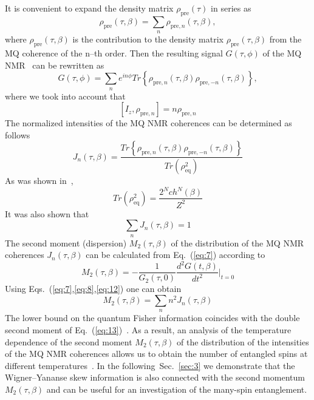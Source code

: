 \documentclass[preprint,12pt]{elsarticle}
\begin{document}
It is convenient to expand the density matrix $\rho_\mathrm{pre}(\tau)$ in series as~\cite{21}
\begin{equation}
    \label{eq:6}
        \rho_\mathrm{pre}(\tau,\beta) = \sum_n \rho_{\mathrm{pre},n}(\tau,\beta),
\end{equation}
where $\rho_\mathrm{pre}(\tau,\beta)$ is the contribution to the density matrix $\rho_\mathrm{pre}(\tau,\beta)$ from the MQ coherence of the n--th order.
Then the resulting signal $G(\tau,\phi)$ of the MQ NMR~\cite{10} can be rewritten as
\begin{equation} \label{eq:7}
    G(\tau, \phi) = \sum_n e^{in\phi}
        Tr\left\{\rho_{\mathrm{pre},n}(\tau,\beta)
        \rho_{\mathrm{pre},-n}(\tau,\beta) \right\},
\end{equation}
where we took into account that
\begin{equation}
    \label{eq:8}
        [I_z, \rho_{\mathrm{pre},n}] = n \rho_{\mathrm{pre},n}
\end{equation}
The normalized intensities of the MQ NMR coherences can be determined as follows
\begin{equation}
    \label{eq:9}
        J_n(\tau,\beta)= \frac{Tr\left\{\rho_{\mathrm{pre},n}(\tau,\beta)
            \rho_{\mathrm{pre},-n}(\tau,\beta)\right\}}
                {Tr(\rho^2_\mathrm{eq})}
\end{equation}
As was shown in~\cite{8},
\begin{equation}
    \label{eq:10}
        Tr(\rho_\mathrm{eq}^2) = \frac{2^N ch^N (\beta)}{Z^2}
\end{equation}
It was also shown that
\begin{equation}
    \label{eq:11}
        \sum_n J_n(\tau,\beta) = 1
\end{equation}
The second moment (dispersion) $M_2(\tau,\beta)$ of the distribution of the MQ NMR coherences $J_n (\tau,\beta)$ can be calculated from Eq.~(\ref{eq:7}) according to~\cite{22}
\begin{equation}
    \label{eq:12}
        M_2(\tau,\beta) = -\frac{1}{G_2(\tau,0)}
            \frac{d^2 G(t,\beta)}{dt^2}\bigg|
        _{t=0}
\end{equation}
Using Eqs.~(\ref{eq:7},\ref{eq:8},\ref{eq:12}) one can obtain
\begin{equation}
    \label{eq:13}
        M_2 (\tau,\beta) = \sum_n n^2 J_n(\tau,\beta)
\end{equation}
The lower bound on the quantum Fisher information coincides with the double second moment of Eq.~(\ref{eq:13})~\cite{7,9}.
As a result, an analysis of the temperature dependence of the second moment $M_2(\tau,\beta)$ of the distribution of the intensities of the MQ NMR coherences allows us to obtain the number of entangled spins at different temperatures~\cite{8}.
In the following~Sec.~\ref{sec:3} we demonstrate that the Wigner--Yananse skew information is also connected with the second momentum $M_2(\tau,\beta)$
and can be useful for an investigation of the many-spin entanglement.
\end{document}
